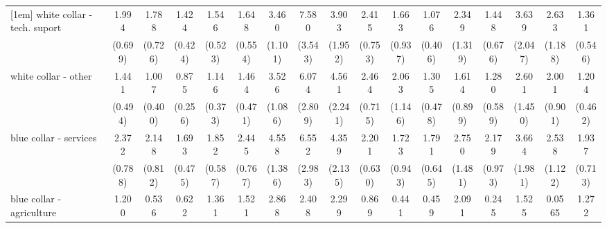 {\begin{tabular}{l*{16}{c}}
[1em]
white collar - tech. suport&       1.994\sym{*}  &       1.788         &       1.424         &       1.546         &       1.648         &       3.460\sym{***}&       7.580\sym{***}&       3.903\sym{**} &       2.415\sym{**} &       1.663         &       1.076         &       2.349         &       1.448         &       3.639\sym{*}  &       2.633\sym{*}  &       1.361         \\
                    &     (0.699)         &     (0.726)         &     (0.424)         &     (0.523)         &     (0.554)         &     (1.101)         &     (3.543)         &     (1.952)         &     (0.753)         &     (0.937)         &     (0.406)         &     (1.319)         &     (0.676)         &     (2.047)         &     (1.188)         &     (0.546)         \\
[1em]
white collar - other&       1.441         &       1.007         &       0.875         &       1.146         &       1.464         &       3.526\sym{***}&       6.074\sym{***}&       4.561\sym{**} &       2.464\sym{**} &       2.063         &       1.305         &       1.614         &       1.280         &       2.601         &       2.001         &       1.204         \\
                    &     (0.494)         &     (0.400)         &     (0.256)         &     (0.373)         &     (0.471)         &     (1.086)         &     (2.809)         &     (2.241)         &     (0.715)         &     (1.146)         &     (0.478)         &     (0.899)         &     (0.589)         &     (1.450)         &     (0.901)         &     (0.462)         \\
[1em]
blue collar - services&       2.372\sym{**} &       2.148\sym{*}  &       1.693         &       1.852         &       2.445\sym{**} &       4.558\sym{***}&       6.552\sym{***}&       4.359\sym{**} &       2.201\sym{**} &       1.723         &       1.791         &       2.750         &       2.179         &       3.664\sym{*}  &       2.538\sym{*}  &       1.937         \\
                    &     (0.788)         &     (0.812)         &     (0.475)         &     (0.587)         &     (0.767)         &     (1.386)         &     (2.983)         &     (2.135)         &     (0.630)         &     (0.943)         &     (0.645)         &     (1.481)         &     (0.973)         &     (1.981)         &     (1.122)         &     (0.713)         \\
[1em]
blue collar - agriculture&       1.200         &       0.536         &       0.622         &       1.361         &       1.521         &       2.868\sym{*}  &       2.408         &       2.299         &       0.869         &       0.441         &       0.459         &       2.091         &       0.245\sym{*}  &       1.525         &      0.0565\sym{***}&       1.272         \\

\end{tabular}}
